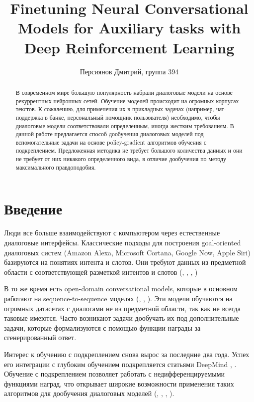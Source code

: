 \documentclass[]{article}
\title{Finetuning Neural Conversational Models for Auxiliary tasks with Deep Reinforcement Learning}
\author{Персиянов Дмитрий, группа 394}
\begin{document}
\date{}
\maketitle

\begin{abstract}
В современном мире большую популярность набрали диалоговые модели на основе рекуррентных нейронных сетей. Обучение моделей происходит на огромных корпусах текстов. К сожалению, для применения их в прикладных задачах (например, чат-поддержка в банке, персональный помощник пользователя) необходимо, чтобы диалоговые модели соответствовали определенным, иногда жестким требованиям. В данной работе предлагается способ дообучения диалоговых моделей под вспомогательные задачи на основе policy-gradient алгоритмов обучения с подкреплением. Предложенная методика не требует большого количества данных и они не требует от них никакого определенного вида, в отличие дообучения по методу максимального правдоподобия.
\end{abstract}

\tableofcontents
\newpage

\section{Введение}

Люди все больше взаимодействуют с компьютером через естественные диалоговые интерфейсы. Классические подходы для построения goal-oriented диалоговых систем (Amazon Alexa, Microsoft Cortana, Google Now, Apple Siri) базируются на понятиях интента и слотов. Они требуют данных из предметной области с соответствующей разметкой интентов и слотов (\cite{DBLP:journals/corr/ZhaoE16}, \cite{rapidly-scaling-dialog-systems-with-interactive-learning}, \cite{DBLP:journals/corr/MrksicSTGSVWY15}, \cite{DBLP:journals/corr/Perez16})

В то же время есть open-domain conversational models, которые в основном работают на sequence-to-sequence моделях (\cite{DBLP:journals/corr/VinyalsL15}, \cite{DBLP:journals/corr/LiGBGD16}, \cite{DBLP:journals/corr/SerbanSBCP15}). Эти модели обучаются на огромных датасетах с диалогами не из предметной области, так как не всегда таковые имеются. Часто возникают задачи дообучать их под дополнительные задачи, которые формализуются с помощью функции награды за сгенерированный ответ.

Интерес к обучению с подкреплением снова вырос за последние два года. Успех его интеграции с глубоким обучением подкрепляется статьями DeepMind  \cite{DBLP:journals/corr/MnihKSGAWR13}, \cite{silver2016mastering}. Обучение с подкреплением позволяет работать с недифференцируемыми функциями наград, что открывает широкие возможности применения таких алгоритмов для дообучения диалоговых моделей (\cite{DBLP:journals/corr/AsadiW16}, \cite{DBLP:journals/corr/BordesW16}, \cite{DBLP:journals/corr/LiMRGGJ16}, \cite{DBLP:journals/corr/LiptonGLLAD16}). 
\end{document}
